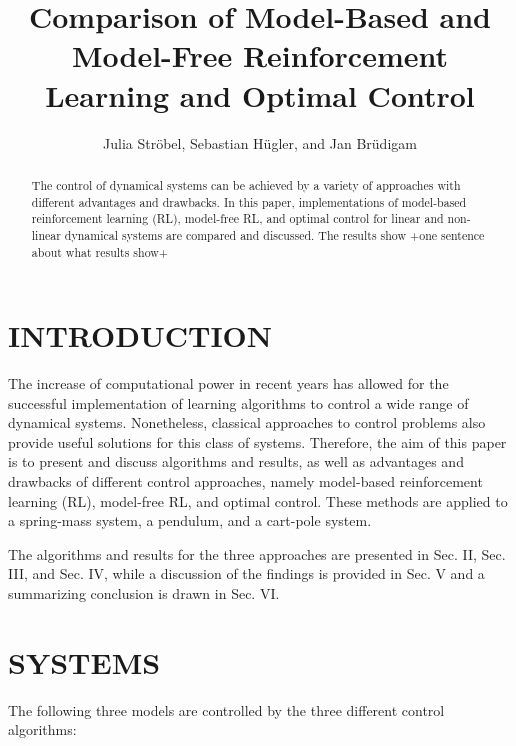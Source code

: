 \documentclass[letterpaper, 10 pt, conference]{ieeeconf}  %
\title{\LARGE \bf
Comparison of Model-Based and Model-Free Reinforcement Learning and Optimal Control
}
\author{Julia Str\"obel, Sebastian H\"ugler, and Jan Br\"udigam}
\begin{document}
\maketitle
\thispagestyle{empty}
\pagestyle{empty}


\begin{abstract}

The control of dynamical systems can be achieved by a variety of approaches with different advantages and drawbacks. In this paper, implementations of model-based reinforcement learning (RL), model-free RL, and optimal control for linear and non-linear dynamical systems are compared and discussed. The results show +one sentence about what results show+

\end{abstract}


\section{INTRODUCTION}

The increase of computational power in recent years has allowed for the successful implementation of learning algorithms to control a wide range of dynamical systems. Nonetheless, classical approaches to control problems also provide 
useful solutions for this class of systems. Therefore, the aim of this paper is to present and discuss algorithms and results, as well as advantages and drawbacks of different control approaches, namely model-based reinforcement learning (RL), model-free RL, and optimal control. These methods are applied to a spring-mass system, a pendulum, and a cart-pole system.

The algorithms and results for the three approaches are presented in Sec. II, Sec. III, and Sec. IV, while a discussion of the findings is provided in Sec. V and a summarizing conclusion is drawn in Sec. VI.

\section{SYSTEMS}
The following three models are controlled by the three different control algorithms:
\end{document}
